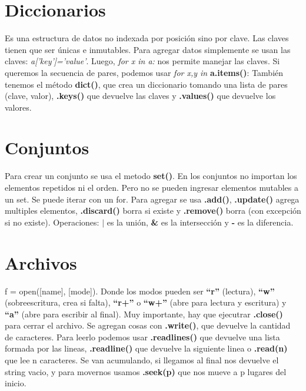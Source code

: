 \documentclass[11pt,a4paper]{article}
\begin{document}
\section{Diccionarios}
Es una estructura de datos no indexada por posici\'on sino por clave. Las claves tienen que ser \'unicas e inmutables. Para agregar datos simplemente se usan las claves: \textit{a['key']='value'}. Luego, \textit{for x in a:} nos permite manejar las claves. Si queremos la secuencia de pares, podemos usar \textit{for x,y in} \textbf{a.items()}: Tambi\'en tenemos el m\'etodo \textbf{dict()}, que crea un diccionario tomando una lista de pares (clave, valor), \textbf{.keys()} que devuelve las claves y \textbf{.values()} que devuelve los valores.

\section{Conjuntos}
Para crear un conjunto se usa el metodo \textbf{set()}. En los conjuntos no importan los elementos repetidos ni el orden. Pero no se pueden ingresar elementos mutables a un set. Se puede iterar con un for. Para agregar se usa \textbf{.add()}, \textbf{.update()} agrega multiples elementos, \textbf{.discard()} borra si existe y \textbf{.remove()} borra (con excepci\'on si no existe). Operaciones: \textbf{$|$} es la uni\'on, \textbf{\&} es la intersecci\'on y \textbf{-} es la diferencia.

\section{Archivos}
f = open([name], [mode]). Donde los modos pueden ser \textbf{``r''} (lectura), \textbf{``w''} (sobreescritura, crea si falta), \textbf{``r+''} o \textbf{``w+''} (abre para lectura y escritura) y \textbf{``a''} (abre para escribir al final). Muy importante, hay que ejecutrar \textbf{.close()} para cerrar el archivo. Se agregan cosas con \textbf{.write()}, que devuelve la cantidad de caracteres. Para leerlo podemos usar \textbf{.readlines()} que devuelve una lista formada por las lineas, \textbf{.readline()} que devuelve la siguiente linea o \textbf{.read(n)} que lee n caracteres. Se van acumulando, si llegamos al final nos devuelve el string vacio, y para movernos usamos \textbf{.seek(p)} que nos mueve a p lugares del inicio.
\end{document}
